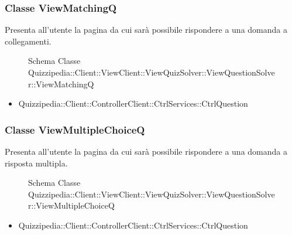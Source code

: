 \subsubsection{Classe ViewMatchingQ}
Presenta all'utente la pagina da cui sarà possibile rispondere a una domanda a collegamenti.
\begin{figure}[H]
\centering
\noindent{}
\caption[Schema Classe ViewMatchingQ]{Schema Classe Quizzipedia::Client::ViewClient::ViewQuizSolver::ViewQuestionSolver::ViewMatchingQ}
\end{figure}
\begin{itemize}
\item Quizzipedia::Client::ControllerClient::CtrlServices::CtrlQuestion
\end{itemize}
\subsubsection{Classe ViewMultipleChoiceQ}
Presenta all'utente la pagina da cui sarà possibile rispondere a una domanda a risposta multipla.
\begin{figure}[H]
\centering
\noindent{}
\caption[Schema Classe ViewMultipleChoiceQ]{Schema Classe Quizzipedia::Client::ViewClient::ViewQuizSolver::ViewQuestionSolver::ViewMultipleChoiceQ}
\end{figure}
\begin{itemize}
\item Quizzipedia::Client::ControllerClient::CtrlServices::CtrlQuestion
\end{itemize}
